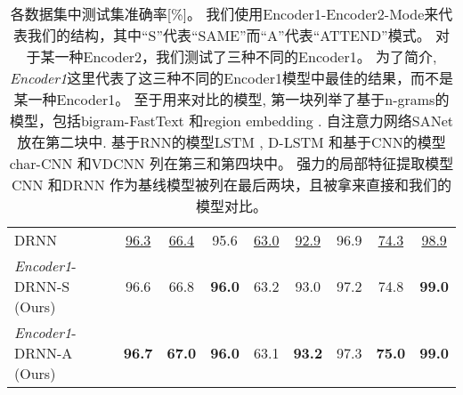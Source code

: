 \begin{table*}[ht]
\begin{center}
{\begin{tabular}{lcccccccc}
      DRNN  \citep{wang2018disconnected}      & \underline{96.3} & \underline{66.4} & {95.6} & \underline{63.0} & \underline{92.9} & 96.9 & \underline{74.3} & \underline{98.9} \\
      \emph{Encoder1}-DRNN-S (Ours)    & 96.6 & 66.8 & \textbf{96.0} & 63.2 & 93.0 & 97.2 & 74.8 & \textbf{99.0} \\
      \emph{Encoder1}-DRNN-A (Ours)      & \textbf{96.7} & \textbf{67.0}  & \textbf{96.0} & 63.1 & \textbf{93.2}  & 97.3 & \textbf{75.0} & \textbf{99.0} \\
     \bottomrule
    \end{tabular}
    }
  \end{center}
    \caption{各数据集中测试集准确率[\%]。
    我们使用Encoder1-Encoder2-Mode来代表我们的结构，其中``S''代表``SAME''而``A''代表``ATTEND''模式。
    对于某一种Encoder2，我们测试了三种不同的Encoder1。
    为了简介, \emph{Encoder1}这里代表了这三种不同的Encoder1模型中最佳的结果，而不是某一种Encoder1。
    至于用来对比的模型, 第一块列举了基于n-grams的模型，包括bigram-FastText \citep{joulin2016bag}和region embedding \citep{qiao2018anew}. 自注意力网络SANet \citep{letarte2018importance}放在第二块中.
    基于RNN的模型LSTM \citep{zhang2015character}, D-LSTM  \citep{yogatama2017generative}和基于CNN的模型char-CNN \citep{zhang2015character} 和VDCNN \citep{conneau2016very}列在第三和第四块中。 强力的局部特征提取模型CNN \citep{kim2014convolutional} 和DRNN \citep{wang2018disconnected} 作为基线模型被列在最后两块，且被拿来直接和我们的模型对比。}
  \label{tab:results}
\end{table*}